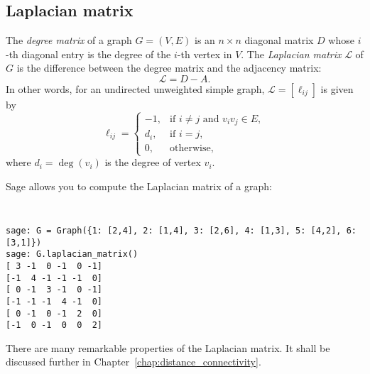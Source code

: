 %



\subsection{Laplacian matrix}

The \emph{degree matrix} of a graph $G = (V,E)$ is an $n \times n$
diagonal matrix $D$ whose $i$-th diagonal entry is the degree of the
$i$-th vertex in $V$. The \emph{Laplacian matrix} $\mathcal{L}$ of $G$
is the difference between the degree matrix and the adjacency matrix:
\[
\mathcal{L} = D - A.
\]
In other words, for an undirected unweighted simple graph,
$\mathcal{L} = [\ell_{ij}]$ is given by
\[
\ell_{ij}
=
\begin{cases}
-1,  & \text{if $i \neq j$ and $v_i v_j \in E$}, \\
d_i, & \text{if $i = j$}, \\
0,   & \text{otherwise},
\end{cases}
\]
where $d_i = \deg(v_i)$ is the degree of vertex $v_i$.

Sage allows you to compute the Laplacian matrix of a graph:
%
\begin{center}
\fontsize{9pt}{9pt}
\selectfont
\tt
\begin{lstlisting}
sage: G = Graph({1: [2,4], 2: [1,4], 3: [2,6], 4: [1,3], 5: [4,2], 6: [3,1]})
sage: G.laplacian_matrix()
[ 3 -1  0 -1  0 -1]
[-1  4 -1 -1 -1  0]
[ 0 -1  3 -1  0 -1]
[-1 -1 -1  4 -1  0]
[ 0 -1  0 -1  2  0]
[-1  0 -1  0  0  2]
\end{lstlisting}
\end{center}
%
There are many remarkable properties of the Laplacian matrix. It shall
be discussed further in Chapter~\ref{chap:distance_connectivity}.


